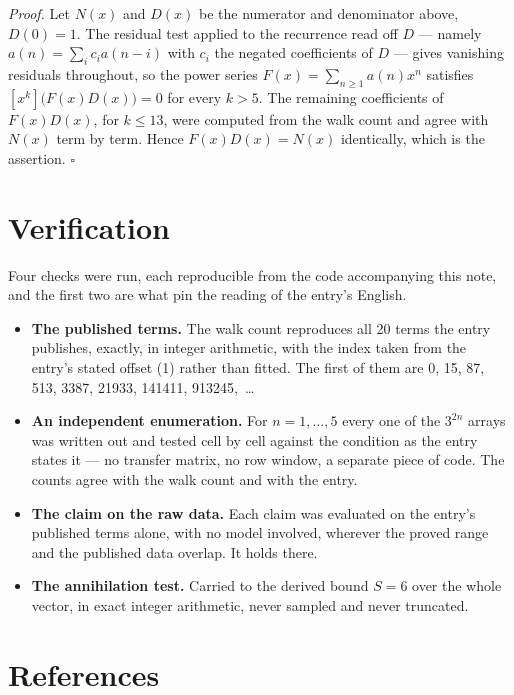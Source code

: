 \documentclass[11pt]{article}
\theoremstyle{definition}
\begin{document}
{\itshape Proof.} Let $N(x)$ and $D(x)$ be the numerator and denominator above, $D(0)=1$. The residual test applied to the recurrence read off $D$ --- namely $a(n) = \sum_i c_i a(n-i)$ with $c_i$ the negated coefficients of $D$ --- gives vanishing residuals throughout, so the power series $F(x)=\sum_{n\ge 1}a(n)x^n$ satisfies $[x^k]\bigl(F(x)D(x)\bigr) = 0$ for every $k > 5$. The remaining coefficients of $F(x)D(x)$, for $k \le 13$, were computed from the walk count and agree with $N(x)$ term by term. Hence $F(x)D(x) = N(x)$ identically, which is the assertion. $\square$

\section{Verification}

Four checks were run, each reproducible from the code accompanying this note, and the first two are what pin the reading of the entry's English.

\begin{itemize}

\item {\bfseries The published terms.} The walk count reproduces all 20 terms the entry publishes, exactly, in integer arithmetic, with the index taken from the entry's stated offset (1) rather than fitted. The first of them are 0, 15, 87, 513, 3387, 21933, 141411, 913245,~\dots

\item {\bfseries An independent enumeration.} For $n = 1,\dots,5$ every one of the $3^{2n}$ arrays was written out and tested cell by cell against the condition as the entry states it --- no transfer matrix, no row window, a separate piece of code. The counts agree with the walk count and with the entry.

\item {\bfseries The claim on the raw data.} Each claim was evaluated on the entry's published terms alone, with no model involved, wherever the proved range and the published data overlap. It holds there.

\item {\bfseries The annihilation test.} Carried to the derived bound $S = 6$ over the whole vector, in exact integer arithmetic, never sampled and never truncated.

\end{itemize}

\section{References}
\end{document}
